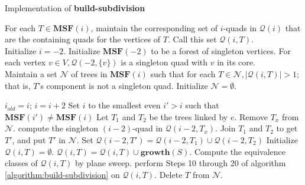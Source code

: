 \begin{algorithm}[H]
	\caption{Implementation of \textbf{build-subdivision}}  \label{algo:impl-build-subdivision}
    For each $T \in \mathbf{MSF}(i)$, maintain the corresponding set of $i$-quads in 
    $\mathcal{Q}(i)$ that are the containing quads for the vertices of $T$. Call this 
    set $\mathcal{Q}(i,T)$. \\
    
    Initialize $i=-2$. Initialize $\mathbf{MSF}(-2)$ to be a forest of singleton 
    vertices. For each vertex $v\in V, \mathcal{Q}(-2,\{v\})$ is a singleton quad 
    with $v$ in its core.\\
    
    Maintain a set $\mathcal{N}$ of trees in $\mathbf{MSF}(i)$ such that for each $T 
    \in \mathcal{N}, |\mathcal{Q}(i,T)| > 1$; that is, $T$'s component is not a 
    singleton quad. Initialize $\mathcal{N} = \emptyset$. \\
	\begin{algorithmic}[1]
        	\State $i_{old} = i$;
            	\State $i = i + 2$
            \Else
            	\State Set $i$ to the smallest even $i' > i$ such that $\mathbf{MSF}
                	   (i') \neq \mathbf{MSF}(i)$
            \EndIf
            	\State Let $T_1$ and $T_2$ be the trees linked by $e$.
                    	\State Remove $T_x$ from $\mathcal{N}$.
                    \Else
                    	\State compute the singleton $(i-2)$-quad in $\mathcal{Q} 
                        	   (i-2 ,T_x)$.
                    \EndIf
                \EndFor
                \State Join $T_1$ and $T_2$ to get $T'$, and put $T'$ in 
                	   $\mathcal{N}$.
                \State Set $\mathcal{Q}(i-2,T') = \mathcal{Q}(i-2, T_1) \cup 
                	   \mathcal{Q}(i-2,T_2)$
            \EndFor
            	\State Initialize $\mathcal{Q}(i,T) = \emptyset$.
                	\State $\mathcal{Q}(i,T) = \mathcal{Q}(i,T) \cup \mathbf{growth}
                    	   (S)$.
                \EndFor
                \State Compute the equivalence classes of $\mathcal{Q}(i,T)$ by plane
                	   sweep.
                \State perform Steps 10 through 20 of algorithm 
                	   \ref{algorithm:build-subdivision} on $\mathcal{Q}(i,T)$.
                	\State Delete $T$ from $\mathcal{N}$.
                \EndIf
            \EndFor
        \EndWhile
	\end{algorithmic} 
\end{algorithm}

